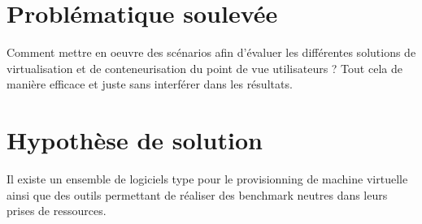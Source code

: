 \section{Problématique soulevée}

\begin{center} 
Comment mettre en oeuvre des scénarios afin d'évaluer les différentes solutions de virtualisation et de conteneurisation du point de vue utilisateurs ? Tout cela de manière efficace et juste sans interférer dans les résultats.
\end{center}

\section{Hypothèse de solution}

Il existe un ensemble de logiciels type pour le provisionning de machine virtuelle ainsi que des outils permettant de réaliser des benchmark neutres dans leurs prises de ressources.

